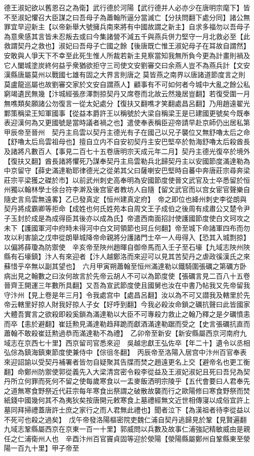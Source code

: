 德王淑妃欲以舊恩召之為衛】武行德於河陽【武行德并人必亦少在唐明宗麾下】皆不至淑妃懼召大臣謀之曰吾母子為蕭翰所逼分當滅亡【分扶問翻下處分同】諸公無罪宜早迎新主【以帝新舉大號擁兵南來將有中國故謂之新主】自求多福勿以吾母子為意衆感其言皆未忍叛去或曰今集諸營不減五千與燕兵併力堅守一月北救必至【此救謂契丹之救也】淑妃曰吾母子亡國之餘【後唐既亡惟王淑妃母子在耳故自謂然】安敢與人爭天下不幸至此死生惟人所裁若新主見察當知我無所負今更為計畫則禍及它人闔城塗炭終何益乎衆猶欲拒守三司使文安劉審交曰余燕人豈不為燕兵計【文安漢縣唐屬莫州以戰國七雄有固之大界言則唐之莫皆燕之南界以唐諸道節度言之則莫盧龍巡屬也故劉審交家於文安自謂燕人】顧事有不可如何者今城中大亂之餘公私窮竭遺民無幾【汴城經張彦澤剽掠契丹又席卷而北故云然幾居豈翻】若復受圍一月無噍類矣願諸公勿復言一從太妃處分【復扶又翻噍才笑翻處昌呂翻】乃用趙遠翟光鄴策稱梁王知軍國事【從益本爵許王以稱號於大梁自稱梁王是已建國更號矣今既奉表迎漢何為又更國號是當時議者禍之也】遣使奉表稱臣迎帝請早赴京師仍出居私第　甲辰帝至晉州　契丹主烏雲以契丹主德光有子在國己以兄子襲位又無舒嚕太后之命【舒嚕太后烏雲祖母也】擅自立内不自安初契丹主安巴堅卒於勃海舒嚕太后殺酋長及諸將凡數百人【事見二百七十五卷唐明宗天成元年二月】契丹主德光復卒於境外【復扶又翻】酋長諸將懼死乃謀奉契丹主烏雲勒兵北歸契丹主以安國節度滿達勒為中京留守【薛史滿達勒耶律德光之從弟其父曰薩喇安巴堅時自蕃中奔唐莊宗尋奔梁莊宗平梁獲之磔於市】以前武州刺史高奉明為安國節度使晉文武官及士卒悉留於恒州獨以翰林學士徐台符李澣及後宫宦者教坊人自隨【留文武官而以宫女宦官聲樂自隨史言烏雲無遠畧】乙已發真定【恒州建真定府】　帝之即位也絳州刺史李從朗與契丹將成霸卿等拒命【成姓也何氏姓苑本自周文王子成伯之後周有成肅公又楚令尹子玉封於成是為成得臣其後亦以成為氏】帝遣西南面招討使護國節度使白文珂攻之未下【護國軍河中府時未得河中白文珂領節也珂丘何翻】帝至城下命諸軍四布而勿攻以利害諭之戊申從朗舉城降帝命親將分護諸門士卒一人毋得入【恐其入城剽掠】以偏將薛瓊為防禦使　辛亥帝至陜州趙暉自御帝馬而入壬子至石壕【九域志陜州陜縣有石壕鎮】汴人有來迎者【汴人越鄭洛而來迎可以見其苦契丹之虐政徯漢氏之來蘇惜乎卒無以副其望也】　六月甲寅朔蕭翰至恒州滿達勒以鐵騎圍張礪之第礪方卧病出見之翰數之曰汝何故言於先帝云胡人不可以為節度使【張礪言見二百八十五卷晉齊王開運三年數所具翻】又吾為宣武節度使且國舅也汝在中書乃帖我又先帝留我守汴州【見上卷是年三月】令我處宫中【處昌呂翻】汝以為不可又譛我及轄里於先帝云轄里好掠人財我好掠人子女【好呼到翻】今我必殺汝命鎖之礪抗聲曰此皆國家大體吾實言之欲殺即殺奚鎖為滿達勒以大臣不可專殺力救止之翰乃釋之是夕礪憤恚而卒【恚於避翻】崔廷勲見滿達勒趋拜跪而獻酒滿達勒踞而受之【史言張礪抗直而蕭翰不敢殺崔廷勲過恭而滿達勒不為禮】　乙卯帝至新安【新安縣屬西京河南府九域志在京西七十里】西京留司官悉來迎　吳越忠獻王弘佐卒【年二十】遺令以丞相弘倧為鎮海鎮東節度使兼侍中【倧徂冬翻】　丙辰帝至洛陽入居宫中汴州百官奉表來迎詔諭以受契丹補署者皆勿自疑聚其告牒而焚之趙遠更名上交【避帝名也更工衡翻】命鄭州防禦使郭從義先入大梁清宫密令殺李從益及王淑妃淑妃且死曰吾兒為契丹所立何罪而死何不留之使每歲寒食以一盂麥飯洒明宗陵乎【五代會要曰人君奉先之道無寒食野祭近代莊宗每年寒食出祭謂之破散故襲而行之歐陽修曰寒食野祭而焚紙錢中國幾何其不為夷狄矣按唐開元敕寒食上墓禮經無文近世相傳寖以成俗宜許上墓同拜掃禮蓋唐許士庶之家行之而人君無此禮也】聞者泣下【為漢祖者待李從益以不死可也殺之過矣】　戊午帝發洛陽樞密院吏魏仁浦自契丹逃歸見於鞏【見賢遍翻九域志鞏縣屬西京在京東一百一十里】郭威問以兵數及故事仁浦強記精敏威由是親任之仁浦衛州人也　辛酉汴州百官竇貞固等迎於滎陽【滎陽縣屬鄭州自鞏縣東至滎陽一百九十里】甲子帝至